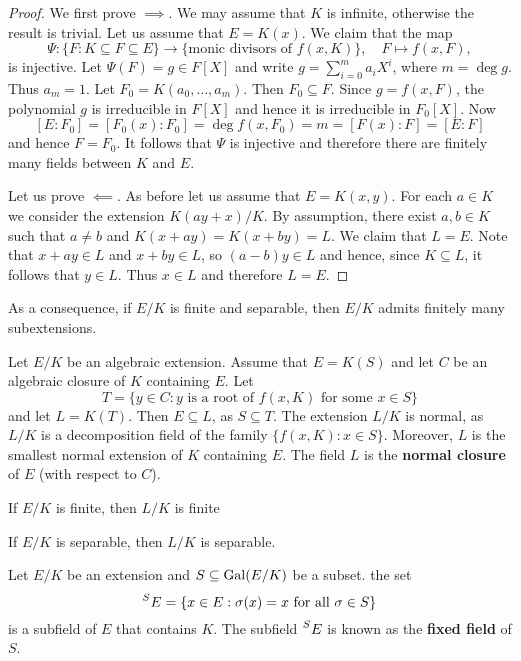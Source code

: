 \begin{proof}
    We first prove $\implies$. 
    We may assume that $K$ is infinite, otherwise the result is trivial. Let us 
    assume that $E=K(x)$. We claim that the map
    \[
    \Psi\colon \{F:K\subseteq F\subseteq E\}\to\{\text{monic divisors of $f(x,K)$}\},
    \quad
    F\mapsto f(x,F),
    \]
    is injective. Let $\Psi(F)=g\in F[X]$ and write $g=\sum_{i=0}^ma_iX^i$, where $m=\deg g$. 
    Thus $a_m=1$. Let $F_0=K(a_0,\dots,a_m)$. Then $F_0\subseteq F$. Since $g=f(x,F)$, the polynomial $g$ is irreducible 
    in $F[X]$ and hence it is irreducible in $F_0[X]$. Now
    \[
    [E:F_0]=[F_0(x):F_0]=\deg f(x,F_0)=m=[F(x):F]=[E:F]
    \]
    and hence $F=F_0$. It follows that $\Psi$ is injective 
    and therefore there are finitely many fields between $K$ and $E$. 
    
    Let us prove $\impliedby$.  
    As before let us assume that $E=K(x,y)$. For each $a\in K$ we consider
    the extension $K(ay+x)/K$. By assumption, there exist $a,b\in K$ such that
    $a\ne b$ and $K(x+ay)=K(x+by)=L$. We claim that $L=E$. Note that 
    $x+ay\in L$ and $x+by\in L$, so $(a-b)y\in L$ and hence, since $K\subseteq L$, it follows that
    $y\in L$. Thus $x\in L$ and therefore $L=E$. 
\end{proof}

As a consequence, if $E/K$ is finite and separable, then $E/K$ admits
finitely many subextensions. 


Let $E/K$ be an algebraic extension. Assume that $E=K(S)$ and
let $C$ be an algebraic closure of $K$ containing $E$. Let 
\[
T=\{y\in C:y\text{ is a root of $f(x,K)$ for some $x\in S$}\}
\]
and let $L=K(T)$. Then $E\subseteq L$, as $S\subseteq T$. The extension
$L/K$ is normal, as $L/K$ is a decomposition field of the family $\{f(x,K):x\in S\}$. 
Moreover, $L$ is the smallest normal extension of $K$ containing $E$. The field
$L$ is the \textbf{normal closure} of $E$ (with respect to $C$). 

\begin{exercise}
If $E/K$ is finite, then $L/K$ is finite
\end{exercise}

\begin{exercise}
If $E/K$ is separable, then $L/K$ is separable.
\end{exercise}

Let $E/K$ be an extension and $S\subseteq\operatorname{Gal}(E/K)$ be a subset. 
the set 
\[
    \prescript{S}{}{E}=\{x\in E:\sigma(x)=x\text{ for all $\sigma\in S$}\}
\]
is a subfield of $E$ that contains $K$. The subfield $\prescript{S}{}{E}$
is known as the \textbf{fixed field} of $S$. 

